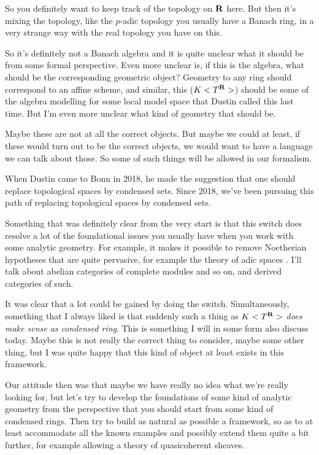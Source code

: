 So you definitely want to keep track of the topology on $\mathbf R$ here. But then it's mixing the topology, like the $p$-adic topology you usually have a Banach ring, in a very strange way with the real topology you have on this. 

So it's definitely not a Banach algebra and it is quite unclear what it should be from some formal perspective.
Even more unclear is, if this is the algebra, what should be the corresponding geometric object? Geometry to any ring should correspond to an affine scheme, and similar, this ($K<T^{\mathbf R}>$) should be some of the algebra modelling for some local model space that Dustin called this last time. 
But I'm even more unclear what kind of geometry that should be.

Maybe these are not at all the correct objects. But maybe we could at least, if these would turn out to be the correct objects, we would want to have a language we can talk about those. So some of such things will be allowed in our formalism.

When Dustin came to Bonn in 2018, he made the suggestion that one should replace topological spaces by condensed sets. Since 2018, we've been pursuing this path of replacing topological spaces by condensed sets.

Something that was definitely clear from the very start is that this switch does resolve a lot of the foundational issues you usually have when you work with some analytic geometry. For example, it makes it possible to remove Noetherian hypotheses that are quite pervasive, for example the theory of adic spaces . I'll talk about abelian categories of complete modules and so on, and derived categories of such.

It was clear that a lot could be gained by doing the switch. Simultaneously, something that I always liked is that suddenly such a thing as \emph{$K<T^{\mathbf R}>$ does make sense as condensed ring}. This is something I will in some form also discuss today. Maybe this is not really the correct thing to consider, maybe some other thing, but I was quite happy that this kind of object at least exists in this framework.

Our attitude then was that maybe we have really no idea what we're really looking for, but let's try to develop the foundations of some kind of analytic geometry from the perspective that you should start from some kind of condensed rings. Then try to build as natural as possible a framework, so as to at least accommodate all the known examples and possibly extend them quite a bit further, for example allowing a theory of quasicoherent sheaves.

